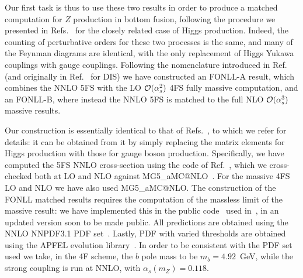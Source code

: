 \documentclass[12pt]{article}
\newcommand{\order}[1]{{\cal O}(#1)}
\begin{document}
Our first task is thus to use these two results in order to produce a
matched computation for $Z$ production in bottom fusion,
following the procedure we
presented in Refs.~\cite{Forte:2015hba,Forte:2016sja} for the closely
related case of Higgs production. Indeed, the counting of perturbative
orders for these two processes is the same, and many of the Feynman
diagrams are identical, with the only replacement of Higgs Yukawa
couplings with gauge couplings. Following the nomenclature introduced
in Ref.~\cite{Forte:2015hba,Forte:2016sja}  (and originally in
Ref.~\cite{Forte:2010ta} for DIS) we have constructed an FONLL-A
result, which combines the NNLO 5FS with the LO  $\order{\alpha_s^2}$
4FS fully massive computation,  and an FONLL-B, where instead the NNLO
5FS is matched to the full  NLO $\order{\alpha_s^3}$ massive
results. 

Our construction is essentially identical to that of
Refs.~\cite{Forte:2015hba,Forte:2016sja}, to which we refer for
details: it can be obtained from it by simply replacing the matrix elements
for Higgs production with those for gauge boson
production. Specifically, we have computed the 5FS NNLO 
cross-section using the 
code of Ref.~\cite{Maltoni:2005wd}, which we cross-checked both 
at LO and NLO against MG5\_aMC@NLO~\cite{Alwall:2014hca}. For the
massive 4FS LO and NLO we have also used  MG5\_aMC@NLO.
The construction of the FONLL matched results requires the computation
of the massless limit of the massive result:  we have implemented this
in the  public code~\cite{code} used in~\cite{Forte:2016sja}, in an
updated version soon to be made public.
All predictions are obtained using the NNLO NNPDF3.1 PDF 
set~\cite{Ball:2017nwa}. Lastly, PDF with varied thresholds
are obtained using the APFEL evolution library~\cite{Bertone:2013vaa}.
In order to be consistent with the PDF set used we take, in the 4F scheme,
the $b$ pole mass to be $m_b=4.92$~GeV, while the strong coupling
is run at NNLO, with $\alpha_s(m_Z) = 0.118$.
\end{document}
